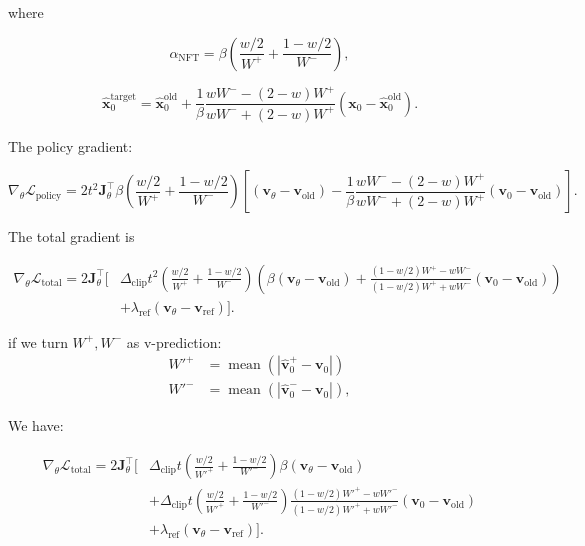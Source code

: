 \documentclass{article} %
\begin{document}
where

\begin{equation}
\alpha_{\mathrm{NFT}}
=
\beta
\left(
\frac{w/2}{W^+}
+
\frac{1-w/2}{W^-}
\right),
\end{equation}


\begin{equation}
\hat{\mathbf{x}}_0^{\mathrm{target}}
=
\hat{\mathbf{x}}_0^{\mathrm{old}}
+
\frac{1}{\beta}
\frac{
wW^--(2-w)W^+
}{
wW^-+(2-w)W^+
}
\left(
\mathbf{x}_0-\hat{\mathbf{x}}_0^{\mathrm{old}}
\right).
\end{equation}


The policy gradient:

\begin{equation}
\nabla_\theta\mathcal{L}_{\mathrm{policy}}
=
2t^2\mathbf{J}_{\theta}^\top
\beta
\left(
\frac{w/2}{W^+}
+
\frac{1-w/2}{W^-}
\right)
\left[
\left(
\mathbf{v}_\theta-\mathbf{v}_{\mathrm{old}}
\right)
-
\frac{1}{\beta}
\frac{
wW^--(2-w)W^+
}{
wW^-+(2-w)W^+
}
\left(
\mathbf{v}_0-\mathbf{v}_{\mathrm{old}}
\right)
\right].
\end{equation}

The total gradient is

\begin{align}
\nabla_\theta\mathcal{L}_{\mathrm{total}}
=
2\mathbf{J}_{\theta}^\top
\Bigg[
&
\Delta_{\mathrm{clip}}t^2
\left(
\frac{w/2}{W^+}
+
\frac{1-w/2}{W^-}
\right)
\left(
\beta
(
\mathbf{v}_\theta-\mathbf{v}_{\mathrm{old}}
)
+
\frac{
(1-w/2)W^+-wW^-
}{
(1-w/2)W^+ + wW^-
}
(\mathbf{v}_0-\mathbf{v}_{\mathrm{old}})
\right)
\nonumber\\
&+
\lambda_{\mathrm{ref}}
\left(
\mathbf{v}_\theta-\mathbf{v}_{\mathrm{ref}}
\right)
\Bigg].
\end{align}



if we turn $W^+, W^-$ as v-prediction:
\begin{align}
W'^+ &= \operatorname{mean}\!\left(\left|\hat{\mathbf{v}}_0^+ - \mathbf{v}_0\right|\right) \\
W'^- &= \operatorname{mean}\!\left(\left|\hat{\mathbf{v}}_0^- - \mathbf{v}_0\right|\right),
\end{align}


We have:

\begin{align}
\nabla_\theta\mathcal{L}_{\mathrm{total}}
=
2\mathbf{J}_{\theta}^\top
\Bigg[
&
\Delta_{\mathrm{clip}}t
\left(
\frac{w/2}{W'^+}
+
\frac{1-w/2}{W'^-}
\right)
\beta
\left(
\mathbf{v}_\theta-\mathbf{v}_{\mathrm{old}}
\right)
\nonumber\\
&+
\Delta_{\mathrm{clip}}t
\left(
\frac{w/2}{W'^+}
+
\frac{1-w/2}{W'^-}
\right)
\frac{
(1-w/2)W'^+-wW'^-
}{
(1-w/2)W'^+ + wW'^-
}
\left(
\mathbf{v}_0-\mathbf{v}_{\mathrm{old}}
\right)
\nonumber\\
&+
\lambda_{\mathrm{ref}}
\left(
\mathbf{v}_\theta-\mathbf{v}_{\mathrm{ref}}
\right)
\Bigg].
\end{align}
\end{document}
